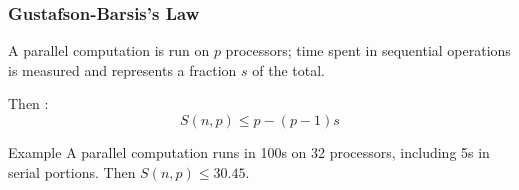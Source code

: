 \documentclass[xcolor={x11names,svgnames,psnames}]{beamer}
\begin{document}
\begin{frame}
  \frametitle{Gustafson-Barsis's Law}
  
  A parallel computation is run on $p$ processors; time spent in sequential operations is measured and represents a fraction $s$ of the total.

  \medskip
  
  Then :
  \[
    S(n, p) \leq  p - (p-1)s
  \]

    \medskip
  
    \begin{block}{Example}
      A parallel computation runs in 100s on 32 processors, including 5s in serial portions.
      Then $S(n, p) \leq 30.45$.
    \end{block}
  \end{frame}


\end{document}
